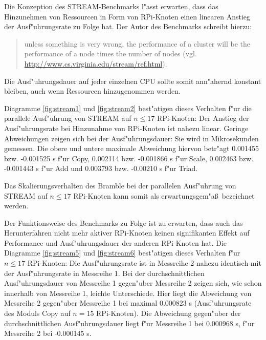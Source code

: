 Die Konzeption des STREAM-Benchmarks l"asst erwarten, dass das Hinzunehmen von Ressourcen in Form von RPi-Knoten einen linearen Anstieg der Ausf"uhrungsrate zu Folge hat. Der Autor des Benchmarks schreibt hierzu: 
\begin{quote}
\onehalfspacing
[\dots] unless something is very wrong, the performance of a cluster will be the performance of a node times the number of nodes (vgl. \url{http://www.cs.virginia.edu/stream/ref.html}).
\end{quote}
Die Ausf"uhrungsdauer auf jeder einzelnen CPU sollte somit ann"ahernd konstant bleiben, auch wenn Ressourcen hinzugenommen werden.

Diagramme \ref{fig:stream1} und \ref{fig:stream2} best"atigen dieses Verhalten f"ur die parallele Ausf"uhrung von STREAM auf $n\leq 17$ RPi-Knoten: Der Anstieg der  Ausf"uhrungsrate bei Hinzunahme von RPi-Knoten ist nahezu linear. Geringe Abweichungen zeigen sich bei der Ausf"uhrungsdauer: Sie wird in Mikrosekunden gemessen. Die obere und untere maximale Abweichung hiervon betr"agt 0.001455 bzw. -0.001525 s f"ur Copy, 0.002114 bzw. -0.001866 s f"ur Scale, 0.002463 bzw. -0.001443 s f"ur Add und 0.003793 bzw. -0.00210 s f"ur Triad. %

Das Skalierungsverhalten des Bramble bei der parallelen Ausf"uhrung von STREAM auf $n\leq 17$ RPi-Knoten kann somit als erwartungsgem"a\ss\ bezeichnet werden. 

Der Funktionsweise des Benchmarks zu Folge ist zu erwarten, dass auch das Herunterfahren nicht mehr aktiver RPi-Knoten keinen signifikanten Effekt auf Performance und Ausf"uhrungsdauer der anderen RPi-Knoten hat. Die Diagramme \ref{fig:stream5} und \ref{fig:stream6} best"atigen dieses Verhalten f"ur $n\leq 17$ RPi-Knoten: Die Ausf"uhrungsrate ist in Messreihe 2 nahezu identisch mit der Ausf"uhrungsrate in Messreihe 1. Bei der durchschnittlichen Ausf"uhrungsdauer von Messreihe 1 gegen"uber Messreihe 2 zeigen sich, wie schon innerhalb von Messreihe 1, leichte Unterschiede. Hier liegt die Abweichung von Messreihe 2 gegen"uber Messreihe 1 bei maximal 0.000823 s (Ausf"uhrungsrate des Moduls Copy auf $n=15$ RPi-Knoten). Die Abweichung gegen"uber der durchschnittlichen Ausf"uhrungsdauer liegt f"ur Messreihe 1 bei 0.000968 s, f"ur Messreihe 2 bei -0.000145 s. %

